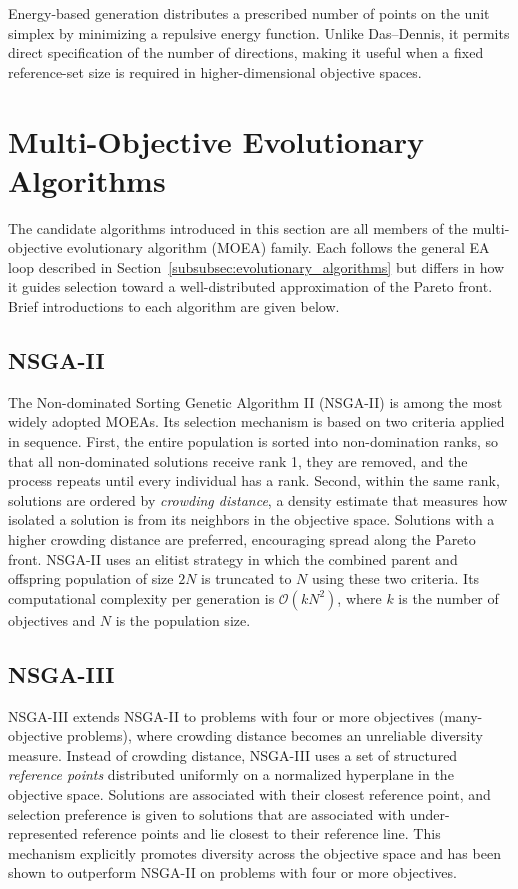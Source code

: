 Energy-based generation distributes a prescribed number of points on the
unit simplex by minimizing a repulsive energy function. Unlike Das--Dennis,
it permits direct specification of the number of directions, making it useful
when a fixed reference-set size is required in higher-dimensional objective
spaces.~\cite{pymoo,ref_dirs_energy}
\section{Multi-Objective Evolutionary Algorithms}
\label{subsec:moea}

The candidate algorithms introduced in this section are all members of the multi-objective evolutionary algorithm (MOEA) family. Each follows the
general EA loop described in Section~\ref{subsubsec:evolutionary_algorithms} but differs in how it guides selection toward a well-distributed
approximation of the Pareto front. Brief introductions to each algorithm are given below.

\subsection{NSGA-II}
\label{subsubsec:nsga2}

The Non-dominated Sorting Genetic Algorithm II (NSGA-II) is among the most widely adopted MOEAs. Its selection mechanism is based on two criteria
applied in sequence. First, the entire population is sorted into non-domination ranks, so that all non-dominated solutions receive rank 1, they are
removed, and the process repeats until every individual has a rank. Second, within the same rank, solutions are ordered by \emph{crowding distance}, a
density estimate that measures how isolated a solution is from its neighbors in the objective space. Solutions with a higher crowding distance are
preferred, encouraging spread along the Pareto front. NSGA-II uses an elitist strategy in which the combined parent and offspring population of size
$2N$ is truncated to $N$ using these two criteria. Its computational complexity per generation is $\mathcal{O}(kN^2)$, where $k$ is the number of
objectives and $N$ is the population size.~\cite{nsga2}

\subsection{NSGA-III}
\label{subsubsec:nsga3}

NSGA-III extends NSGA-II to problems with four or more objectives (many-objective problems), where crowding distance becomes an unreliable diversity
measure. Instead of crowding distance, NSGA-III uses a set of structured \emph{reference points} distributed uniformly on a normalized hyperplane in
the objective space. Solutions are associated with their closest reference point, and selection preference is given to solutions that are associated
with under-represented reference points and lie closest to their reference line. This mechanism explicitly promotes diversity across the objective
space and has been shown to outperform NSGA-II on problems with four or more objectives.~\cite{nsga3}

